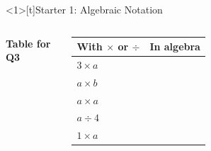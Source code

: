 \documentclass{beamer}
\newcommand{\ablank}[1]{%
  \alt<2>{\textcolor{red}{#1}}{\underline{\phantom{#1}}}%
}
\newcommand{\dheading}[1]{{\scriptsize\bfseries #1}\par\vspace{0.2em}}
\newcommand{\tblank}[1]{\ablank{\makebox[1.6em]{#1}}}
\newcommand{\tgiven}[1]{\makebox[1.6em]{#1}}
\begin{document}
\begin{frame}<1>[t]{Starter 1: Algebraic Notation}
\begin{columns}[T,onlytextwidth]

\vspace{-0.4em}
\dheading{Table for Q3}
{\footnotesize
\renewcommand{\arraystretch}{1.25}
\begin{tabular}{@{}l|l@{}}
  With $\times$ or $\div$ & In algebra\\ \hline
  $3\times a$ & \tgiven{$3a$}\\
  $a\times b$ & \tblank{$ab$}\\
  $a\times a$ & \tblank{$a^2$}\\
  $a\div4$    & \tblank{$\dfrac{a}{4}$}\\[2pt]
  $1\times a$ & \tblank{$a$}
\end{tabular}}


\end{columns}
\end{frame}
\end{document}
